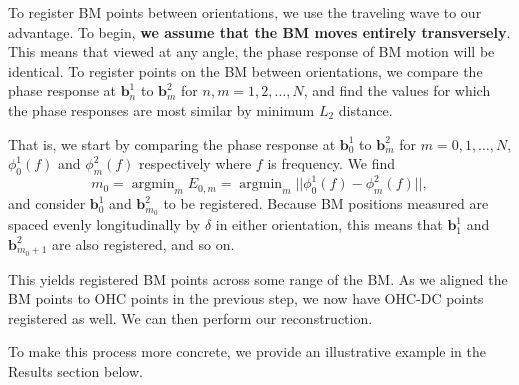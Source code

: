 \documentclass[preprint,NumberedRefs]{JASA}
\DeclareMathOperator*{\argmin}{argmin}
\begin{document}
\par{To register BM points between orientations, we use the traveling wave to our advantage. To begin, \textbf{we assume that the BM moves entirely transversely}. This means that viewed at any angle, the phase response of BM motion will be identical. To register points on the BM between orientations, we compare the phase response at $\mathbf{b}^1_n$ to $\mathbf{b}^2_m$ for $n,m=1,2,\ldots,N$, and find the values for which the phase responses are most similar by minimum $L_2$ distance.}
\par{That is, we start by comparing the phase response at $\mathbf{b}^1_0$ to $\mathbf{b}^2_m$ for $m=0,1,\ldots,N$, $\phi^1_0(f)$ and $\phi^2_m(f)$ respectively where $f$ is frequency. We find 
	\begin{equation}
		m_0 = \argmin_m E_{0,m} = \argmin_m ||\phi^1_0(f)-\phi^2_m(f)||,
	\end{equation}
and consider $\mathbf{b}^1_0$ and $\mathbf{b}^2_{m_0}$ to be registered. Because BM positions measured are spaced evenly longitudinally by $\delta$ in either orientation, this means that $\mathbf{b}^1_1$ and $\mathbf{b}^2_{m_0+1}$ are also registered, and so on.}
\par{This yields registered BM points across some range of the BM. As we aligned the BM points to OHC points in the previous step, we now have OHC-DC points registered as well. We can then perform our reconstruction.}
\par{To make this process more concrete, we provide an illustrative example in the Results section below.}
\end{document}
